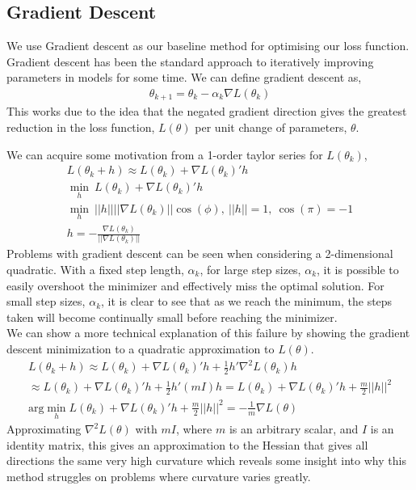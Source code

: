 \documentclass{article}
\begin{document}
\subsection{Gradient Descent}
We use Gradient descent as our baseline method for optimising our loss function.
Gradient descent has been the standard approach to iteratively improving parameters in models for some time. We can define gradient descent as,
\begin{gather*}
\theta_{k+1} = \theta_{k} - \alpha_k \nabla L(\theta_k)
\end{gather*}
This works due to the idea that the negated gradient direction gives the greatest reduction in the loss function, $L(\theta)$ per unit change of parameters, $\theta$.

We can acquire some motivation from a 1-order taylor series for $L(\theta_k)$,
\begin{gather*}
L(\theta_k + h) \approx L(\theta_k) + \nabla L(\theta_k)'h\\
\min_h\ L(\theta_k) + \nabla L(\theta_k)'h\\
\min_h\ ||h||||\nabla L(\theta_k)||\cos(\phi),\ ||h||=1,\ \cos(\pi) = -1\\
h = -\frac{\nabla L(\theta_k)}{||\nabla L(\theta_k)||}
\end{gather*}
Problems with gradient descent can be seen when considering a 2-dimensional quadratic. 
With a fixed step length, $\alpha_k$,
for large step sizes, $\alpha_k$, it is possible to easily overshoot the minimizer and effectively miss the optimal solution. For small step sizes, $\alpha_k$, it is clear to see that as we reach the minimum, the steps taken will become continually small before reaching the minimizer.\\


 We can show a more technical explanation of this failure by showing the gradient descent minimization to a quadratic approximation to $L(\theta)$.
\begin{gather*}
L(\theta_k + h) \approx L(\theta_k) + \nabla L(\theta_k)'h + \frac{1}{2}h'\nabla^2L(\theta_k)h\\
\approx L(\theta_k) + \nabla L(\theta_k)'h + \frac{1}{2}h'(mI)h = L(\theta_k) + \nabla L(\theta_k)'h + \frac{m}{2}||h||^2\\
\text{arg}\min_h L(\theta_k) + \nabla L(\theta_k)'h + \frac{m}{2}||h||^2 = -\frac{1}{m}\nabla L(\theta)
\end{gather*}
Approximating $\nabla^2L(\theta)$ with $mI$, where $m$ is an arbitrary scalar, and $I$ is an identity matrix, this gives an approximation to the Hessian that gives all directions the same very high curvature which reveals some insight into why this method struggles on problems where curvature varies greatly.
\end{document}
